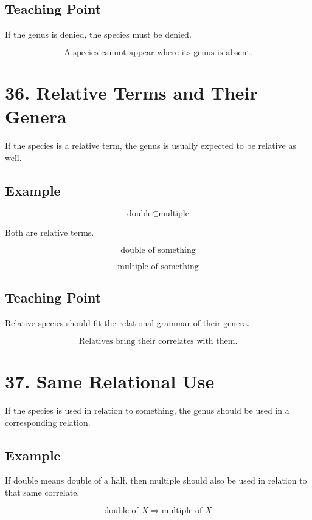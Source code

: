 \documentclass[12pt]{article}
\begin{document}
\subsection*{Teaching Point}

If the genus is denied, the species must be denied.

\[
\boxed{
\text{A species cannot appear where its genus is absent.}
}
\]

\section*{36. Relative Terms and Their Genera}

If the species is a relative term, the genus is usually expected to be relative
as well.

\subsection*{Example}

\[
\text{double} \subset \text{multiple}
\]

Both are relative terms.

\[
\text{double of something}
\]

\[
\text{multiple of something}
\]

\subsection*{Teaching Point}

Relative species should fit the relational grammar of their genera.

\[
\boxed{
\text{Relatives bring their correlates with them.}
}
\]

\section*{37. Same Relational Use}

If the species is used in relation to something, the genus should be used in a
corresponding relation.

\subsection*{Example}

If double means double of a half, then multiple should also be used in relation
to that same correlate.

\[
\text{double of } X
\Rightarrow
\text{multiple of } X
\]
\end{document}

